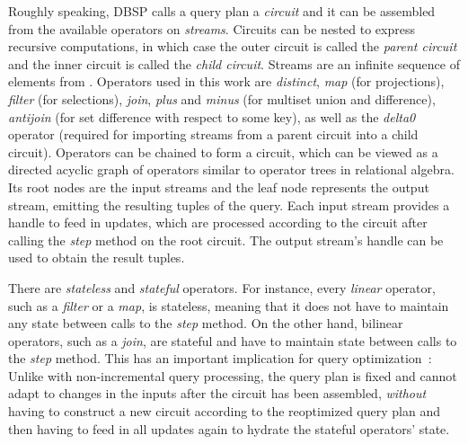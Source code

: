 
Roughly speaking, DBSP calls a query plan a \emph{circuit}
and it can be assembled from the available operators on \emph{streams}.
Circuits can be nested to express recursive computations, in which case
the outer circuit is called the \emph{parent circuit} and the inner circuit
is called the \emph{child circuit}.
Streams are an infinite sequence of elements from \zsets{}.
Operators used in this work are \emph{distinct},
\emph{map} (for projections), \emph{filter} (for selections),
\emph{join}, \emph{plus} and \emph{minus} (for multiset union and difference),
\emph{antijoin} (for set difference with respect to some key),
as well as the \emph{delta0} operator (required for importing streams
from a parent circuit into a child circuit).
Operators can be chained to form a circuit, which can be viewed as
a directed acyclic graph of operators similar to operator trees in relational algebra.
Its root nodes are the input streams and the leaf node represents the output
stream, emitting the resulting tuples of the query.
Each input stream provides a handle to feed in updates, which are processed
according to the circuit after calling the \emph{step} method on the root
circuit.
The output stream's handle can be used to obtain the result tuples.

There are \emph{stateless} and \emph{stateful} operators.
For instance, every \emph{linear} operator, such as a \emph{filter} or a \emph{map},
is stateless, meaning that it does not have to maintain any state between
calls to the \emph{step} method.
On the other hand, bilinear operators, such as a \emph{join}, are stateful
and have to maintain state between calls to the \emph{step} method.
This has an important implication for query optimization~\cite{budiu2025dbsp}:
Unlike with non-incremental query processing, the query plan is fixed and cannot
adapt to changes in the inputs after the circuit has been assembled,
\emph{without} having to construct a new circuit according to the
reoptimized query plan and then having to feed in all updates again
to hydrate the stateful operators' state.

